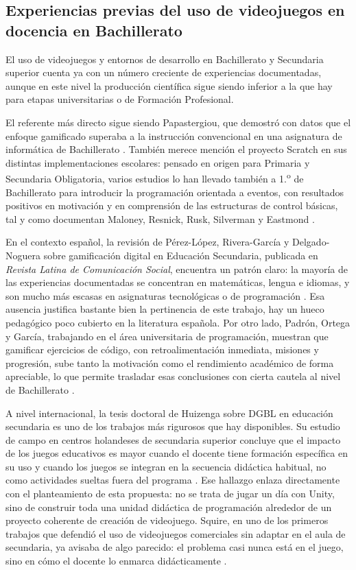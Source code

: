 \documentclass[a4paper,12pt]{article}
\begin{document}
\subsection{Experiencias previas del uso de videojuegos en docencia en Bachillerato}

El uso de videojuegos y entornos de desarrollo en Bachillerato y Secundaria superior cuenta ya con un número creciente de experiencias documentadas, aunque en este nivel la producción científica sigue siendo inferior a la que hay para etapas universitarias o de Formación Profesional.

El referente más directo sigue siendo Papastergiou, que demostró con datos que el enfoque gamificado superaba a la instrucción convencional en una asignatura de informática de Bachillerato \citep{papastergiou2009digital}. También merece mención el proyecto Scratch en sus distintas implementaciones escolares: pensado en origen para Primaria y Secundaria Obligatoria, varios estudios lo han llevado también a 1.\textsuperscript{o} de Bachillerato para introducir la programación orientada a eventos, con resultados positivos en motivación y en comprensión de las estructuras de control básicas, tal y como documentan Maloney, Resnick, Rusk, Silverman y Eastmond \citep{maloney2010scratch}.

En el contexto español, la revisión de Pérez-López, Rivera-García y Delgado-Noguera sobre gamificación digital en Educación Secundaria, publicada en \textit{Revista Latina de Comunicación Social}, encuentra un patrón claro: la mayoría de las experiencias documentadas se concentran en matemáticas, lengua e idiomas, y son mucho más escasas en asignaturas tecnológicas o de programación \citep{revistacomunicacion2022}. Esa ausencia justifica bastante bien la pertinencia de este trabajo, hay un hueco pedagógico poco cubierto en la literatura española. Por otro lado, Padrón, Ortega y García, trabajando en el área universitaria de programación, muestran que gamificar ejercicios de código, con retroalimentación inmediata, misiones y progresión, sube tanto la motivación como el rendimiento académico de forma apreciable, lo que permite trasladar esas conclusiones con cierta cautela al nivel de Bachillerato \citep{padron2022gamificacion}.

A nivel internacional, la tesis doctoral de Huizenga sobre DGBL en educación secundaria es uno de los trabajos más rigurosos que hay disponibles. Su estudio de campo en centros holandeses de secundaria superior concluye que el impacto de los juegos educativos es mayor cuando el docente tiene formación específica en su uso y cuando los juegos se integran en la secuencia didáctica habitual, no como actividades sueltas fuera del programa \citep{amsterdam2017dgbl}. Ese hallazgo enlaza directamente con el planteamiento de esta propuesta: no se trata de jugar un día con Unity, sino de construir toda una unidad didáctica de programación alrededor de un proyecto coherente de creación de videojuego. Squire, en uno de los primeros trabajos que defendió el uso de videojuegos comerciales sin adaptar en el aula de secundaria, ya avisaba de algo parecido: el problema casi nunca está en el juego, sino en cómo el docente lo enmarca didácticamente \citep{squire2003video}.
\end{document}
